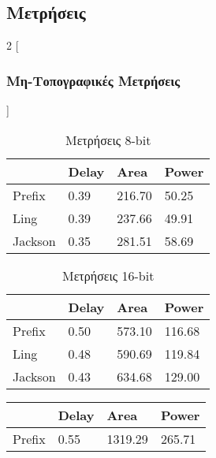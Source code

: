 \subsection{Μετρήσεις}
\begin{multicols}{2}
[\subsubsection{Μη-Τοπογραφικές Μετρήσεις}]
\begin{table}[H]
\centering
     \begin{tabular}{||p{1.2cm} | p{0.7cm}  p{1cm}  p{1cm} ||} 
        \hline
         & Delay & Area & Power \\ [0.5ex] 
        \hline\hline
        Prefix  & 0.39  & 216.70    & 50.25 \\ 
        \hline
        Ling    & 0.39  & 237.66    & 49.91 \\
        \hline
        Jackson & 0.35  & 281.51    & 58.69 \\
        \hline
    \end{tabular}
\caption{Μετρήσεις 8-bit}
\label{result_table_8}
\end{table}
\begin{table}[H]
\centering
     \begin{tabular}{||p{1.2cm} | p{0.7cm} p{1cm} p{1cm} ||} 
        \hline
        & Delay & Area & Power \\ [0.5ex] 
        \hline\hline
        Prefix  & 0.50  & 573.10    & 116.68 \\ 
        \hline
        Ling    & 0.48  & 590.69    & 119.84 \\
        \hline
        Jackson & 0.43  & 634.68    & 129.00 \\
        \hline
    \end{tabular}
\caption{Μετρήσεις 16-bit}
\label{result_table_16}
\end{table}
\begin{table}[H]
\centering
     \begin{tabular}{||p{1.2cm} | p{0.7cm} p{1cm} p{1cm} ||} 
        \hline
        & Delay & Area & Power \\ [0.5ex] 
        \hline\hline
        Prefix  & 0.55  & 1319.29    & 265.71 \\ 
        \hline

\end{tabular}
\end{table}
\end{multicols}

